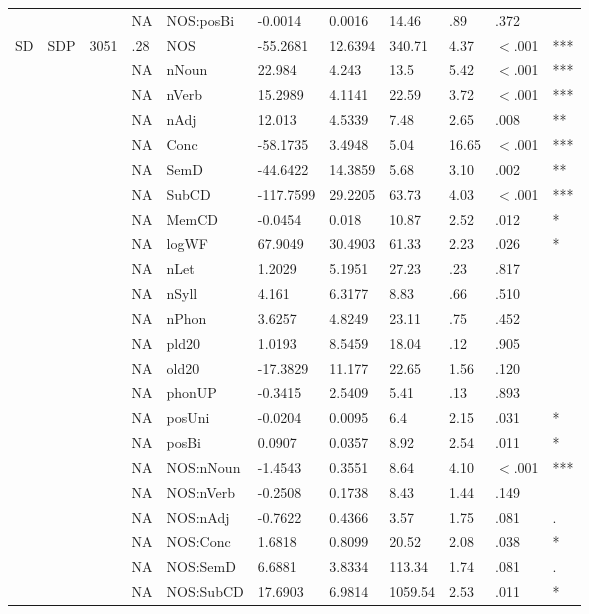 \begin{table}[ht]
\begin{tabular}{lllllllllll}
   &  &  & NA & NOS:posBi & -0.0014 & 0.0016 & 14.46 & .89 & .372 &   \\ 
  SD & SDP & 3051 & .28 & NOS & -55.2681 & 12.6394 & 340.71 & 4.37 & $<$.001 & *** \\ 
   &  &  & NA & nNoun & 22.984 & 4.243 & 13.5 & 5.42 & $<$.001 & *** \\ 
   &  &  & NA & nVerb & 15.2989 & 4.1141 & 22.59 & 3.72 & $<$.001 & *** \\ 
   &  &  & NA & nAdj & 12.013 & 4.5339 & 7.48 & 2.65 & .008 & ** \\ 
   &  &  & NA & Conc & -58.1735 & 3.4948 & 5.04 & 16.65 & $<$.001 & *** \\ 
   &  &  & NA & SemD & -44.6422 & 14.3859 & 5.68 & 3.10 & .002 & ** \\ 
   &  &  & NA & SubCD & -117.7599 & 29.2205 & 63.73 & 4.03 & $<$.001 & *** \\ 
   &  &  & NA & MemCD & -0.0454 & 0.018 & 10.87 & 2.52 & .012 & * \\ 
   &  &  & NA & logWF & 67.9049 & 30.4903 & 61.33 & 2.23 & .026 & * \\ 
   &  &  & NA & nLet & 1.2029 & 5.1951 & 27.23 & .23 & .817 &   \\ 
   &  &  & NA & nSyll & 4.161 & 6.3177 & 8.83 & .66 & .510 &   \\ 
   &  &  & NA & nPhon & 3.6257 & 4.8249 & 23.11 & .75 & .452 &   \\ 
   &  &  & NA & pld20 & 1.0193 & 8.5459 & 18.04 & .12 & .905 &   \\ 
   &  &  & NA & old20 & -17.3829 & 11.177 & 22.65 & 1.56 & .120 &   \\ 
   &  &  & NA & phonUP & -0.3415 & 2.5409 & 5.41 & .13 & .893 &   \\ 
   &  &  & NA & posUni & -0.0204 & 0.0095 & 6.4 & 2.15 & .031 & * \\ 
   &  &  & NA & posBi & 0.0907 & 0.0357 & 8.92 & 2.54 & .011 & * \\ 
   &  &  & NA & NOS:nNoun & -1.4543 & 0.3551 & 8.64 & 4.10 & $<$.001 & *** \\ 
   &  &  & NA & NOS:nVerb & -0.2508 & 0.1738 & 8.43 & 1.44 & .149 &   \\ 
   &  &  & NA & NOS:nAdj & -0.7622 & 0.4366 & 3.57 & 1.75 & .081 & . \\ 
   &  &  & NA & NOS:Conc & 1.6818 & 0.8099 & 20.52 & 2.08 & .038 & * \\ 
   &  &  & NA & NOS:SemD & 6.6881 & 3.8334 & 113.34 & 1.74 & .081 & . \\ 
   &  &  & NA & NOS:SubCD & 17.6903 & 6.9814 & 1059.54 & 2.53 & .011 & * \\ 

\end{tabular}
\end{table}
